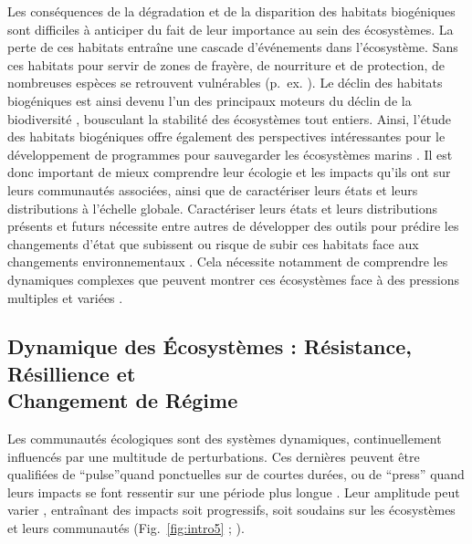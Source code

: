 \begin{refsection}
Les conséquences de la dégradation et de la disparition des habitats
biogéniques sont difficiles à anticiper du fait de leur importance au
sein des écosystèmes. La perte de ces habitats entraîne une cascade
d'événements dans l'écosystème. Sans ces habitats pour servir de zones
de frayère, de nourriture et de protection, de nombreuses espèces se
retrouvent vulnérables (p.~ex. \textcite{Hughes_2009}). Le déclin des
habitats biogéniques est ainsi devenu l'un des principaux moteurs du
déclin de la biodiversité \autocite{ipbes_2019}, bousculant la stabilité
des écosystèmes tout entiers. Ainsi, l'étude des habitats biogéniques
offre également des perspectives intéressantes pour le développement de
programmes pour sauvegarder les écosystèmes marins \autocite{Loh_2019}.
Il est donc important de mieux comprendre leur écologie et les impacts
qu'ils ont sur leurs communautés associées, ainsi que de caractériser
leurs états et leurs distributions à l'échelle globale. Caractériser
leurs états et leurs distributions présents et futurs nécessite entre
autres de développer des outils pour prédire les changements d'état que
subissent ou risque de subir ces habitats face aux changements
environnementaux \autocite{Wernberg_2023}. Cela nécessite notamment de
comprendre les dynamiques complexes que peuvent montrer ces écosystèmes
face à des pressions multiples et variées \autocite{Nystrom_2012}.

\hypertarget{dynamique-des-uxe9cosystuxe8mes-ruxe9sistance-ruxe9sillience-et-changement-de-ruxe9gime}{%
\subsection{Dynamique des Écosystèmes : Résistance, Résillience et \\
Changement de
Régime}\label{dynamique-des-uxe9cosystuxe8mes-ruxe9sistance-ruxe9sillience-et-changement-de-ruxe9gime}}

Les communautés écologiques sont des systèmes dynamiques,
continuellement influencés par une multitude de perturbations. Ces
dernières peuvent être qualifiées de ``pulse''quand ponctuelles sur de
courtes durées, ou de ``press'' quand leurs impacts se font ressentir
sur une période plus longue \autocites[ ]{Bender_1984}{Ryo_2019}. Leur
amplitude peut varier \autocite{Jentsch_2019}, entraînant des impacts
soit progressifs, soit soudains sur les écosystèmes et leurs communautés
(Fig.~\ref{fig:intro5} ; \textcite{Spake_2022}).


\end{refsection}
